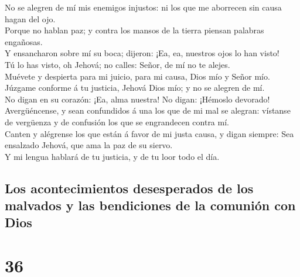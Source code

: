  No se alegren de mí mis enemigos injustos: ni los que me
aborrecen sin causa hagan del ojo.\\
 Porque no hablan paz; y contra los mansos de la tierra
piensan palabras engañosas.\\
 Y ensancharon sobre mí su boca; dijeron: ¡Ea, ea,
nuestros ojos lo han visto!\\
 Tú lo has visto, oh Jehová; no calles: Señor, de mí no
te alejes.\\
 Muévete y despierta para mi juicio, para mi causa, Dios
mío y Señor mío.\\
 Júzgame conforme á tu justicia, Jehová Dios mío; y no se
alegren de mí.\\
 No digan en su corazón: ¡Ea, alma nuestra! No digan:
¡Hémoslo devorado!\\
 Avergüéncense, y sean confundidos á una los que de mi
mal se alegran: vístanse de vergüenza y de confusión los que se
engrandecen contra mí.\\
 Canten y alégrense los que están á favor de mi justa
causa, y digan siempre: Sea ensalzado Jehová, que ama la paz de su
siervo.\\
 Y mi lengua hablará de tu justicia, y de tu loor todo el
día.

\hypertarget{los-acontecimientos-desesperados-de-los-malvados-y-las-bendiciones-de-la-comuniuxf3n-con-dios}{%
\subsection{Los acontecimientos desesperados de los malvados y las
bendiciones de la comunión con
Dios}\label{los-acontecimientos-desesperados-de-los-malvados-y-las-bendiciones-de-la-comuniuxf3n-con-dios}}

\hypertarget{section-19-36}{%
\section{36}\label{section-19-36}}

